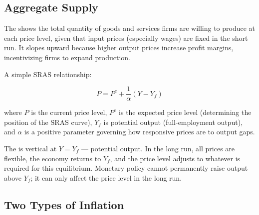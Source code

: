 \subsection{Aggregate Supply}

The  shows the total quantity
of goods and services firms are willing to produce at each price level,
given that input prices (especially wages) are fixed in the short run.
It slopes upward because higher output prices increase profit margins,
incentivizing firms to expand production.

A simple SRAS relationship:

\begin{equation}
  P = P^e + \frac{1}{\alpha}(Y - Y_f)
  \label{eq:sras}
\end{equation}

\noindent where $P$ is the current price level, $P^e$ is the expected
price level (determining the position of the SRAS curve), $Y_f$ is
potential output (full-employment output), and $\alpha$ is a positive
parameter governing how responsive prices are to output gaps.

The  is vertical at
$Y = Y_f$ --- potential output. In the long run, all prices are flexible,
the economy returns to $Y_f$, and the price level adjusts to whatever is
required for this equilibrium. Monetary policy cannot permanently raise
output above $Y_f$; it can only affect the price level in the long run.

\subsection{Two Types of Inflation}

